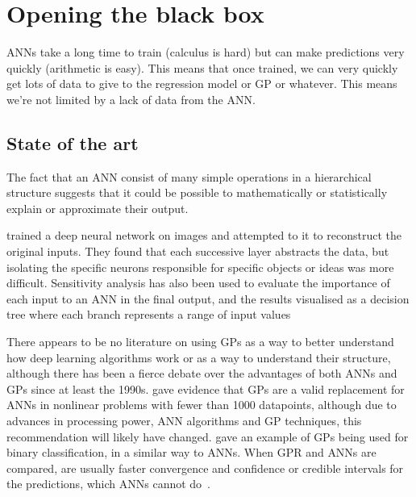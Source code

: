 
\chapter{Opening the black box}

\aclp{ANN} take a long time to train (calculus is hard) but can make predictions very quickly (arithmetic is easy).
This means that once trained, we can very quickly get lots of data to give to the regression model or \ac{GP} or whatever.
This means we're not limited by a lack of data from the \acl{ANN}.

\section{State of the art}

The fact that  an \acl{ANN} consist of many simple operations in a hierarchical structure suggests that it could be possible to mathematically or statistically explain or approximate their output.

\textcite[13]{cortez2013} trained a deep neural network on images and attempted to  it to reconstruct the original inputs.
They found that each successive layer abstracts the data, but isolating the specific neurons responsible for specific objects or ideas was more difficult.
Sensitivity analysis has also been used to evaluate the importance of each input to an \acl{ANN} in the final output, and the results visualised as a decision tree where each branch represents a range of input values~

There appears to be no literature on using \acp{GP} as a way to better understand how deep learning algorithms work or as a way to understand their structure, although there has been a fierce debate over the advantages of both \aclp{ANN} and \acp{GP} since at least the 1990s.
\textcite[65--66]{rasmussen1997} gave evidence that \acp{GP} are a valid replacement for \aclp{ANN} in nonlinear problems with fewer than 1000 datapoints, although due to advances in processing power, \acl{ANN} algorithms and \ac{GP} techniques, this recommendation will likely have changed.
\textcite[25]{mackay1997} gave an example of \acp{GP} being used for binary classification, in a similar way to \aclp{ANN}.
When \ac{GPR} and \aclp{ANN} are compared,  are usually faster convergence and confidence or credible intervals for the predictions, which \aclp{ANN} cannot do~\autocite{herbrich2003}.

